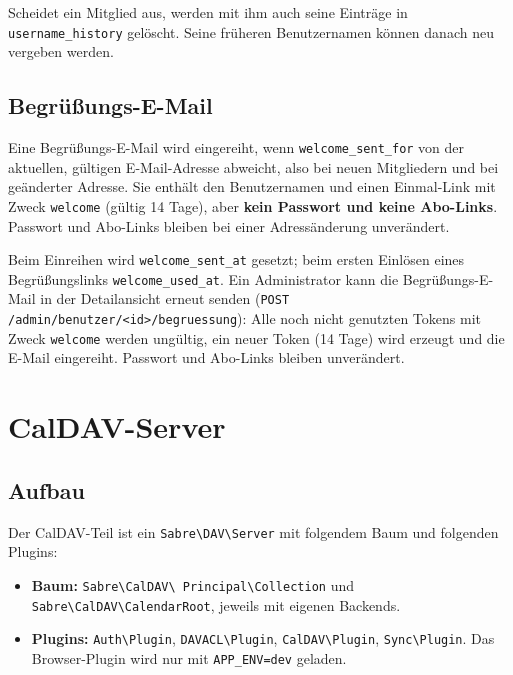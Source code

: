 \documentclass[a4paper,fontsize=10pt]{scrartcl}
\newcommand{\code}[1]{\texttt{#1}}
\begin{document}
Scheidet ein Mitglied aus, werden mit ihm auch seine Einträge in
\code{username\_history} gelöscht. Seine früheren Benutzernamen können
danach neu vergeben werden.

\subsection{Begrüßungs-E-Mail}

Eine Begrüßungs-E-Mail wird eingereiht, wenn \code{welcome\_sent\_for}
von der aktuellen, gültigen E-Mail-Adresse abweicht, also bei neuen
Mitgliedern und bei geänderter Adresse. Sie enthält den Benutzernamen und
einen Einmal-Link mit Zweck \code{welcome} (gültig 14 Tage), aber
\textbf{kein Passwort und keine Abo-Links}. Passwort und Abo-Links bleiben
bei einer Adressänderung unverändert.

Beim Einreihen wird \code{welcome\_sent\_at} gesetzt; beim ersten Einlösen
eines Begrüßungslinks \code{welcome\_used\_at}. Ein Administrator kann die
Begrüßungs-E-Mail in der Detailansicht erneut senden
(\code{POST /admin/benutzer/<id>/begruessung}): Alle noch nicht genutzten
Tokens mit Zweck \code{welcome} werden ungültig, ein neuer Token (14 Tage)
wird erzeugt und die E-Mail eingereiht. Passwort und Abo-Links bleiben
unverändert.

\section{CalDAV-Server}

\subsection{Aufbau}

Der CalDAV-Teil ist ein \code{Sabre\textbackslash DAV\textbackslash Server}
mit folgendem Baum und folgenden Plugins:

\begin{itemize}
  \item \textbf{Baum:} \code{Sabre\textbackslash CalDAV\textbackslash
        Principal\textbackslash Collection} und
        \code{Sabre\textbackslash CalDAV\textbackslash CalendarRoot}, jeweils
        mit eigenen Backends.
  \item \textbf{Plugins:} \code{Auth\textbackslash Plugin},
        \code{DAVACL\textbackslash Plugin}, \code{CalDAV\textbackslash Plugin},
        \code{Sync\textbackslash Plugin}. Das Browser-Plugin wird nur mit
        \code{APP\_ENV=dev} geladen.
\end{itemize}
\end{document}
